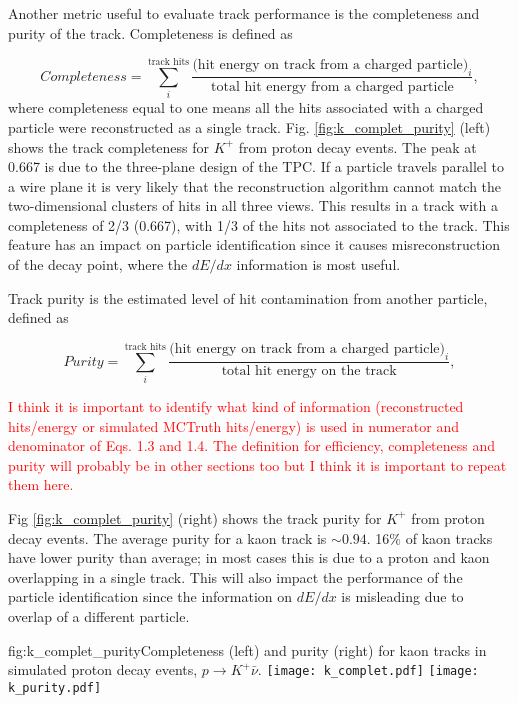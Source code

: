 Another metric useful to evaluate track performance is the completeness and purity of the track. Completeness is defined as

 \begin{equation}
Completeness = \sum_{i}^{\mbox{track hits}}\frac{\mbox{(hit energy on track from a charged particle)}_{i}}{\mbox{total hit energy from a charged particle}},
\end{equation}
where completeness equal to one means all the hits associated with a charged particle were reconstructed as a single track. 
Fig. \ref{fig:k_complet_purity} (left) shows the track completeness for $K^{+}$ from proton decay events. The peak at 0.667 is due to the three-plane design of the TPC.  If a particle travels parallel to a wire plane it is very likely that the reconstruction algorithm cannot match the two-dimensional clusters of hits in all three views.  This results in a track with a completeness of 2/3 (0.667), with 1/3 of the hits not associated to the track.  This feature has an impact on particle identification since it causes misreconstruction of the decay point, where the $dE/dx$ information is most useful.

Track purity is the estimated level of hit contamination from another particle, defined as

\begin{equation}
Purity = \sum_{i}^{\mbox{track hits}}\frac{\mbox{(hit energy on track from a charged particle)}_{i}}{\mbox{total hit energy on the track}},
\end{equation}

\textcolor{red}{I think it is important to identify what kind of information (reconstructed hits/energy or simulated MCTruth hits/energy) is used in numerator and denominator of Eqs. 1.3 and 1.4. The definition for efficiency, completeness and purity will probably be in other sections too but I think it is important to repeat them here.}

Fig \ref{fig:k_complet_purity} (right) shows the track purity for $K^{+}$ from proton decay events. The average purity for a kaon track is $\sim0.94$. 
16$\%$ of kaon tracks have lower purity than average; in most cases this is due to a proton and kaon overlapping in a single track. This will also impact the performance of the particle identification since the information on $dE/dx$ is misleading due to overlap of a different particle. 

\begin{dunefigure}{fig:k_complet_purity}{Completeness (left) and purity (right) for kaon tracks in simulated proton decay events, $p\rightarrow K^{+} \bar{\nu}$.}
\texttt{[image: k\_complet.pdf]}
\texttt{[image: k\_purity.pdf]}
\end{dunefigure}

